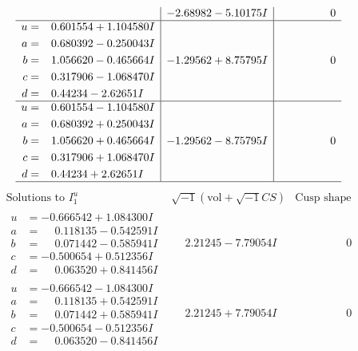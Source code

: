\documentclass[1p]{elsarticle_modified}
\theoremstyle{definition}
\newcommand{\I}{\sqrt{-1}}
\begin{document}
$$\begin{array}{c|c|c}
 & -2.68982 - 5.10175 I & \phantom{-0.000000 } 0 \\ \hline\begin{aligned}
u &= \phantom{-}0.601554 + 1.104580 I \\
a &= \phantom{-}0.680392 - 0.250043 I \\
b &= \phantom{-}1.056620 - 0.465664 I \\
c &= \phantom{-}0.317906 - 1.068470 I \\
d &= \phantom{-}0.44234 - 2.62651 I\end{aligned}
 & -1.29562 + 8.75795 I & \phantom{-0.000000 } 0 \\ \hline\begin{aligned}
u &= \phantom{-}0.601554 - 1.104580 I \\
a &= \phantom{-}0.680392 + 0.250043 I \\
b &= \phantom{-}1.056620 + 0.465664 I \\
c &= \phantom{-}0.317906 + 1.068470 I \\
d &= \phantom{-}0.44234 + 2.62651 I\end{aligned}
 & -1.29562 - 8.75795 I & \phantom{-0.000000 } 0\\
 \hline 
 \end{array}$$\newpage$$\begin{array}{c|c|c}  
\text{Solutions to }I^u_{1}& \I (\text{vol} + \sqrt{-1}CS) & \text{Cusp shape}\\
 \hline 
\begin{aligned}
u &= -0.666542 + 1.084300 I \\
a &= \phantom{-}0.118135 - 0.542591 I \\
b &= \phantom{-}0.071442 - 0.585941 I \\
c &= -0.500654 + 0.512356 I \\
d &= \phantom{-}0.063520 + 0.841456 I\end{aligned}
 & \phantom{-}2.21245 - 7.79054 I & \phantom{-0.000000 } 0 \\ \hline\begin{aligned}
u &= -0.666542 - 1.084300 I \\
a &= \phantom{-}0.118135 + 0.542591 I \\
b &= \phantom{-}0.071442 + 0.585941 I \\
c &= -0.500654 - 0.512356 I \\
d &= \phantom{-}0.063520 - 0.841456 I\end{aligned}
 & \phantom{-}2.21245 + 7.79054 I & \phantom{-0.000000 } 0 \\ \hline\begin{aligned}

\end{aligned}
\end{array}$$
\end{document}
